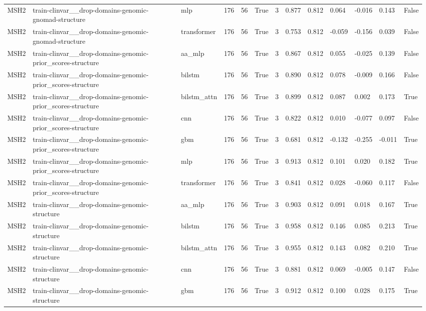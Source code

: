 \begin{table}[t]
\begin{tabular}{lllllllllllll}
MSH2 & train-clinvar\_\_drop-domains-genomic-gnomad-structure & mlp & 176 & 56 & True & 3 & 0.877 & 0.812 & 0.064 & -0.016 & 0.143 & False \\
MSH2 & train-clinvar\_\_drop-domains-genomic-gnomad-structure & transformer & 176 & 56 & True & 3 & 0.753 & 0.812 & -0.059 & -0.156 & 0.039 & False \\
MSH2 & train-clinvar\_\_drop-domains-genomic-prior\_scores-structure & aa\_mlp & 176 & 56 & True & 3 & 0.867 & 0.812 & 0.055 & -0.025 & 0.139 & False \\
MSH2 & train-clinvar\_\_drop-domains-genomic-prior\_scores-structure & bilstm & 176 & 56 & True & 3 & 0.890 & 0.812 & 0.078 & -0.009 & 0.166 & False \\
MSH2 & train-clinvar\_\_drop-domains-genomic-prior\_scores-structure & bilstm\_attn & 176 & 56 & True & 3 & 0.899 & 0.812 & 0.087 & 0.002 & 0.173 & True \\
MSH2 & train-clinvar\_\_drop-domains-genomic-prior\_scores-structure & cnn & 176 & 56 & True & 3 & 0.822 & 0.812 & 0.010 & -0.077 & 0.097 & False \\
MSH2 & train-clinvar\_\_drop-domains-genomic-prior\_scores-structure & gbm & 176 & 56 & True & 3 & 0.681 & 0.812 & -0.132 & -0.255 & -0.011 & True \\
MSH2 & train-clinvar\_\_drop-domains-genomic-prior\_scores-structure & mlp & 176 & 56 & True & 3 & 0.913 & 0.812 & 0.101 & 0.020 & 0.182 & True \\
MSH2 & train-clinvar\_\_drop-domains-genomic-prior\_scores-structure & transformer & 176 & 56 & True & 3 & 0.841 & 0.812 & 0.028 & -0.060 & 0.117 & False \\
MSH2 & train-clinvar\_\_drop-domains-genomic-structure & aa\_mlp & 176 & 56 & True & 3 & 0.903 & 0.812 & 0.091 & 0.018 & 0.167 & True \\
MSH2 & train-clinvar\_\_drop-domains-genomic-structure & bilstm & 176 & 56 & True & 3 & 0.958 & 0.812 & 0.146 & 0.085 & 0.213 & True \\
MSH2 & train-clinvar\_\_drop-domains-genomic-structure & bilstm\_attn & 176 & 56 & True & 3 & 0.955 & 0.812 & 0.143 & 0.082 & 0.210 & True \\
MSH2 & train-clinvar\_\_drop-domains-genomic-structure & cnn & 176 & 56 & True & 3 & 0.881 & 0.812 & 0.069 & -0.005 & 0.147 & False \\
MSH2 & train-clinvar\_\_drop-domains-genomic-structure & gbm & 176 & 56 & True & 3 & 0.912 & 0.812 & 0.100 & 0.028 & 0.175 & True \\

\end{tabular}
\end{table}
